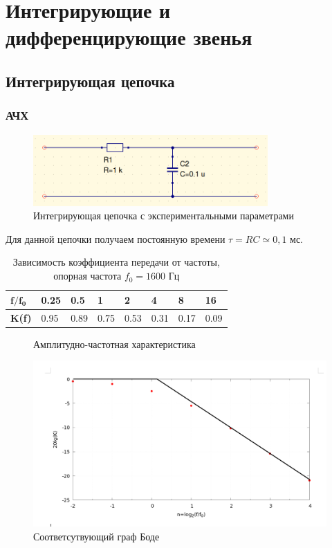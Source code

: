 \documentclass[a4paper, 12pt]{article}
\begin{document}


\section*{Интегрирующие и дифференцирующие звенья}

\subsection*{Интегрирующая цепочка}
\subsubsection*{АЧХ}
\begin{figure}[H]
\centering
\includegraphics[width=0.8\textwidth]{1-int}
\caption{Интегрирующая цепочка с экспериментальными параметрами}
\end{figure}

Для данной цепочки получаем постоянную времени $\tau = RC \simeq 0,1 $ мс. 

\begin{table}[H]
\centering
\begin{tabular}{|l|l|l|l|l|l|l|l|}
\hline
\textbf{$\mathbf{f/f_0}$} & 0.25 & 0.5  & 1    & 2    & 4    & 8    & 16   \\ \hline
\textbf{K(f)}    & 0.95 & 0.89 & 0.75 & 0.53 & 0.31 & 0.17 & 0.09 \\ \hline
\end{tabular}
\caption{Зависимость коэффициента передачи от частоты, опорная частота $f_0 = 1600$ Гц}
\label{my-label}
\end{table}
\begin{figure}[H]
\centering

\caption{Амплитудно-частотная характеристика}
\end{figure}

\begin{figure}[H]
\centering
\includegraphics[width=1\textwidth]{bodeint}
\caption{Соответсутвующий граф Боде}
\end{figure}
\end{document}
